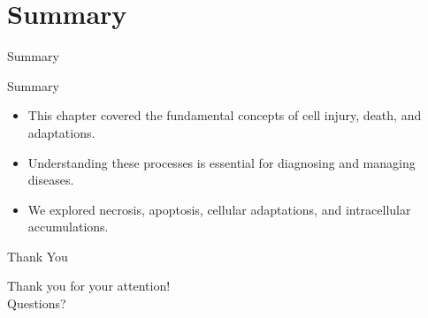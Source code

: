\documentclass{beamer}
\begin{document}
	\section{Summary}
	\begin{frame}{Summary}
	\end{frame}
	\begin{frame}{Summary}
		\begin{itemize}
			\item This chapter covered the fundamental concepts of cell injury, death, and adaptations.
			\item Understanding these processes is essential for diagnosing and managing diseases.
			\item We explored necrosis, apoptosis, cellular adaptations, and intracellular accumulations.
		\end{itemize}
	\end{frame}
	
	\begin{frame}{Thank You}
		\begin{center}
			Thank you for your attention!\\
			Questions?
		\end{center}
	\end{frame}
	
\end{document}
